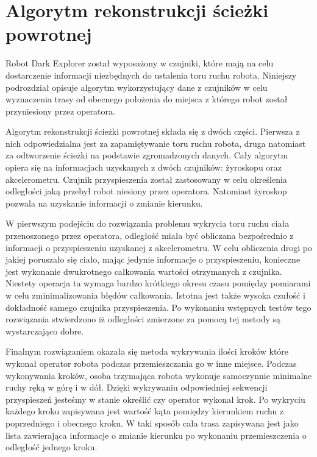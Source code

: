 \section{Algorytm rekonstrukcji ścieżki powrotnej}
\label{sec:rtrwca}
Robot Dark Explorer został wyposażony w czujniki, które mają na celu dostarczenie
informacji niezbędnych do ustalenia toru ruchu robota. Niniejszy podrozdział
opisuje algorytm wykorzystujący dane z czujników w celu wyznaczenia trasy od
obecnego położenia do miejsca z którego robot został przyniesiony przez
operatora.

Algorytm rekonstrukcji ścieżki powrotnej składa się z dwóch części. Pierwsza z
nich odpowiedzialna jest za zapamiętywanie toru ruchu robota, druga natomiast za
odtworzenie ścieżki na podstawie zgromadzonych danych. Cały algorytm opiera się
na informacjach uzyskanych z dwóch czujników: żyroskopu oraz akcelerometru.
Czujnik przyspieszenia został zastosowany w celu określenia odległości jaką
przebył robot niesiony przez operatora. Natomiast żyroskop pozwala na uzyskanie
informacji o zmianie kierunku.

W pierwszym podejściu do rozwiązania problemu wykrycia toru ruchu ciała
przenoszonego przez operatora, odległość miała być obliczana bezpośrednio z
informacji o przyspieszeniu uzyskanej z akcelerometru. W celu obliczenia drogi po
jakiej poruszało się ciało, mając jedynie informacje o przyspieszeniu, konieczne
jest wykonanie dwukrotnego całkowania wartości otrzymanych z czujnika. Niestety
operacja ta wymaga bardzo krótkiego okresu czasu pomiędzy pomiarami w celu
zminimalizowania błędów całkowania. Istotna jest także wysoka czułość i
dokładność samego czujnika przyspieszenia. Po wykonaniu wstępnych testów tego
rozwiązania stwierdzono iż odległości zmierzone za pomocą tej metody są
wystarczająco dobre.

Finalnym rozwiązaniem okazała się metoda wykrywania ilości kroków które wykonał
operator robota podczas przemieszczania go w inne miejsce. Podczas wykonywania
kroków, osoba trzymająca robota wykonuje samoczynnie minimalne ruchy ręką w górę
i w dół. Dzięki wykrywaniu odpowiedniej sekwencji przyspieszeń jesteśmy w stanie
określić czy operator wykonał krok. Po wykryciu każdego kroku zapisywana jest
wartość kąta pomiędzy kierunkiem ruchu z poprzedniego i obecnego kroku. W taki
sposób cała trasa zapisywana jest jako lista zawierająca informacje o zmianie
kierunku po wykonaniu przemieszczenia o odległość jednego kroku.
